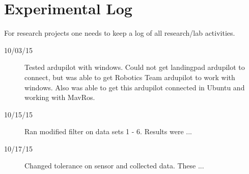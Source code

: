 
\chapter{Experimental Log}

For research projects one needs to keep a log of all research/lab activities.   


\begin{description}
\item [10/03/15]  Tested ardupilot with windows. Could not get landingpad ardupilot to connect, but was able to get Robotics Team ardupilot to work with windows. Also was able to get this ardupilot connected in Ubuntu and working with MavRos.
\item [10/15/15]  Ran modified filter on data sets 1 - 6.  Results were ...
\item [10/17/15]  Changed tolerance on sensor and collected data.  These ...
\end{description}
